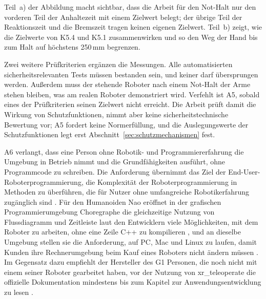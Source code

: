 Teil~a) der Abbildung macht sichtbar, dass die Arbeit für den Not-Halt nur den vorderen Teil der Anhaltezeit mit einem Zielwert belegt; der übrige Teil der Reaktionszeit und die Bremszeit tragen keinen eigenen Zielwert.
Teil~b) zeigt, wie die Zielwerte von K5.4 und K5.1 zusammenwirken und so den Weg der Hand bis zum Halt auf höchstens 250\,mm begrenzen.

Zwei weitere Prüfkriterien ergänzen die Messungen.
Alle automatisierten sicherheitsrelevanten Tests müssen bestanden sein, und keiner darf übersprungen werden. %
Außerdem muss der stehende Roboter nach einem Not-Halt der Arme stehen bleiben, was am realen Roboter demonstriert wird. %
Verfehlt ist A5, sobald eines der Prüfkriterien seinen Zielwert nicht erreicht.
Die Arbeit prüft damit die Wirkung von Schutzfunktionen, nimmt aber keine sicherheitstechnische Bewertung vor; A5 fordert keine Normerfüllung, und die Auslegungswerte der Schutzfunktionen legt erst Abschnitt~\ref{sec:schutzmechanismen} fest.

A6 verlangt, dass eine Person ohne Robotik- und Programmiererfahrung die Umgebung in Betrieb nimmt und die Grundfähigkeiten ausführt, ohne Programmcode zu schreiben.
Die Anforderung übernimmt das Ziel der End-User-Roboterprogrammierung, die Komplexität der Roboterprogrammierung in Methoden zu überführen, die für Nutzer ohne umfangreiche Robotikerfahrung zugänglich sind \cite{Ajaykumar2021}.
Für den Humanoiden Nao eröffnet in der grafischen Programmierumgebung Choregraphe die gleichzeitige Nutzung von Flussdiagramm und Zeitleiste laut den Entwicklern viele Möglichkeiten, mit dem Roboter zu arbeiten, ohne eine Zeile C++ zu kompilieren \cite{Pot2009}, und an dieselbe Umgebung stellen sie die Anforderung, auf PC, Mac und Linux zu laufen, damit Kunden ihre Rechnerumgebung beim Kauf eines Roboters nicht ändern müssen \cite{Pot2009}.
Im Gegensatz dazu empfiehlt der Hersteller des G1 Personen, die noch nicht mit einem seiner Roboter gearbeitet haben, vor der Nutzung von xr\_teleoperate die offizielle Dokumentation mindestens bis zum Kapitel zur Anwendungsentwicklung zu lesen \cite{UnitreeXRTeleop}.


